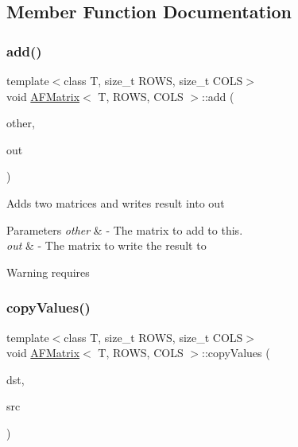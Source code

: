 \subsection{Member Function Documentation}
\mbox{\label{class_a_f_matrix_aad31e9f92bfa3323313b153fddcd676b}} 
\subsubsection{\texorpdfstring{add()}{add()}}
{\footnotesize\ttfamily template$<$class T, size\+\_\+t R\+O\+WS, size\+\_\+t C\+O\+LS$>$ \\
void \hyperlink{class_a_f_matrix}{A\+F\+Matrix}$<$ T, R\+O\+WS, C\+O\+LS $>$\+::add (\begin{DoxyParamCaption}\item[{\hyperlink{class_a_f_matrix}{A\+F\+Matrix}$<$ T, R\+O\+WS, C\+O\+LS $>$ $\ast$}]{other,  }\item[{\hyperlink{class_a_f_matrix}{A\+F\+Matrix}$<$ T, R\+O\+WS, C\+O\+LS $>$ $\ast$}]{out }\end{DoxyParamCaption})\hspace{0.3cm}{\ttfamily [inline]}}

Adds two matrices and writes result into {\ttfamily out} 
\begin{DoxyParams}{Parameters}
{\em other} & -\/ The matrix to add to {\ttfamily this}. \\
\hline
{\em out} & -\/ The matrix to write the result to \\
\hline
\end{DoxyParams}
\begin{DoxyWarning}{Warning}
requires 
\end{DoxyWarning}
\mbox{\label{class_a_f_matrix_ad44dc733a8bcf412437d0beebd458176}} 
\subsubsection{\texorpdfstring{copy\+Values()}{copyValues()}\hspace{0.1cm}{\footnotesize\ttfamily [1/3]}}
{\footnotesize\ttfamily template$<$class T, size\+\_\+t R\+O\+WS, size\+\_\+t C\+O\+LS$>$ \\
void \hyperlink{class_a_f_matrix}{A\+F\+Matrix}$<$ T, R\+O\+WS, C\+O\+LS $>$\+::copy\+Values (\begin{DoxyParamCaption}\item[{\hyperlink{class_a_f_matrix}{A\+F\+Matrix}$<$ T, R\+O\+WS, C\+O\+LS $>$ $\ast$}]{dst,  }\item[{\hyperlink{class_a_f_matrix}{A\+F\+Matrix}$<$ T, R\+O\+WS, C\+O\+LS $>$ $\ast$}]{src }\end{DoxyParamCaption})\hspace{0.3cm}{\ttfamily [inline]}}

